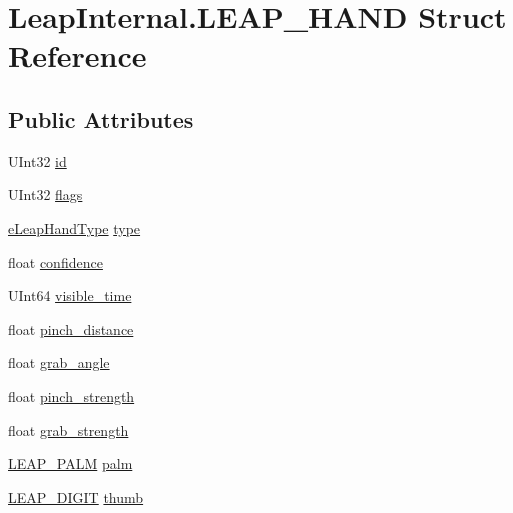 \hypertarget{struct_leap_internal_1_1_l_e_a_p___h_a_n_d}{}\section{Leap\+Internal.\+L\+E\+A\+P\+\_\+\+H\+A\+ND Struct Reference}
\label{struct_leap_internal_1_1_l_e_a_p___h_a_n_d}
\subsection*{Public Attributes}
\begin{DoxyCompactItemize}
\item 
U\+Int32 \mbox{\hyperlink{struct_leap_internal_1_1_l_e_a_p___h_a_n_d_ad687e67a1fa2ca2639f38d8bccdad604}{id}}
\item 
U\+Int32 \mbox{\hyperlink{struct_leap_internal_1_1_l_e_a_p___h_a_n_d_a069542284f1363ee9eee07d1c6a069bb}{flags}}
\item 
\mbox{\hyperlink{namespace_leap_internal_a937dea95e06bb1e2723e0dbb486c9b34}{e\+Leap\+Hand\+Type}} \mbox{\hyperlink{struct_leap_internal_1_1_l_e_a_p___h_a_n_d_a8886518627849651eeac8689b5d286d6}{type}}
\item 
float \mbox{\hyperlink{struct_leap_internal_1_1_l_e_a_p___h_a_n_d_af968432e661d23e109bd75a1ac5f2771}{confidence}}
\item 
U\+Int64 \mbox{\hyperlink{struct_leap_internal_1_1_l_e_a_p___h_a_n_d_abada54a2c239ed9a4e8954e2a31f956f}{visible\+\_\+time}}
\item 
float \mbox{\hyperlink{struct_leap_internal_1_1_l_e_a_p___h_a_n_d_a7d474430f035090a06208aaacb5cd39f}{pinch\+\_\+distance}}
\item 
float \mbox{\hyperlink{struct_leap_internal_1_1_l_e_a_p___h_a_n_d_a45ec78e4195a36c33f109077d6054c17}{grab\+\_\+angle}}
\item 
float \mbox{\hyperlink{struct_leap_internal_1_1_l_e_a_p___h_a_n_d_a63ff5a9b82dedc0b47bb3beaf5e80552}{pinch\+\_\+strength}}
\item 
float \mbox{\hyperlink{struct_leap_internal_1_1_l_e_a_p___h_a_n_d_a73c3d0244746c6c13462749a5f6f72d3}{grab\+\_\+strength}}
\item 
\mbox{\hyperlink{struct_leap_internal_1_1_l_e_a_p___p_a_l_m}{L\+E\+A\+P\+\_\+\+P\+A\+LM}} \mbox{\hyperlink{struct_leap_internal_1_1_l_e_a_p___h_a_n_d_a399699cefefd1dfb6a0cc2329009b249}{palm}}
\item 
\mbox{\hyperlink{struct_leap_internal_1_1_l_e_a_p___d_i_g_i_t}{L\+E\+A\+P\+\_\+\+D\+I\+G\+IT}} \mbox{\hyperlink{struct_leap_internal_1_1_l_e_a_p___h_a_n_d_a39b289e9efe9220a413b3027eeed29de}{thumb}}

\end{DoxyCompactItemize}
